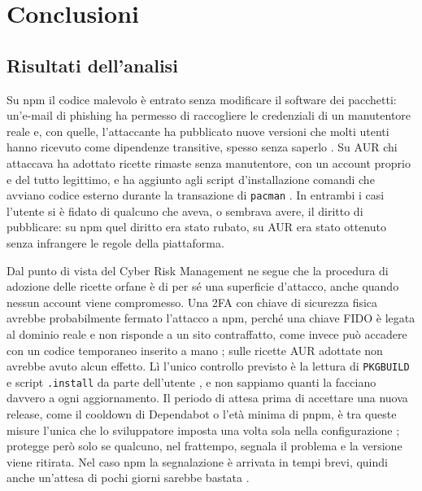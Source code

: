 \section{Conclusioni}
\subsection{Risultati dell'analisi}
Su npm il codice malevolo è entrato senza modificare il software dei pacchetti: un'e-mail di phishing ha permesso di raccogliere le credenziali di un manutentore reale e, con quelle, l'attaccante ha pubblicato nuove versioni che molti utenti hanno ricevuto come dipendenze transitive, spesso senza saperlo \cite{aikido2025,debug2025}. Su AUR chi attaccava ha adottato ricette rimaste senza manutentore, con un account proprio e del tutto legittimo, e ha aggiunto agli script d'installazione comandi che avviano codice esterno durante la transazione di \texttt{pacman} \cite{arch-aur-incident-2026,aur-mail-gnome-randr}. In entrambi i casi l'utente si è fidato di qualcuno che aveva, o sembrava avere, il diritto di pubblicare: su npm quel diritto era stato rubato, su AUR era stato ottenuto senza infrangere le regole della piattaforma.

Dal punto di vista del Cyber Risk Management ne segue che la procedura di adozione delle ricette orfane è di per sé una superficie d'attacco, anche quando nessun account viene compromesso. Una 2FA con chiave di sicurezza fisica avrebbe probabilmente fermato l'attacco a npm, perché una chiave FIDO è legata al dominio reale e non risponde a un sito contraffatto, come invece può accadere con un codice temporaneo inserito a mano \cite{npm-2fa-docs-2026}; sulle ricette AUR adottate non avrebbe avuto alcun effetto. Lì l'unico controllo previsto è la lettura di \texttt{PKGBUILD} e script \texttt{.install} da parte dell'utente \cite{arch-aur-incident-2026}, e non sappiamo quanti la facciano davvero a ogni aggiornamento. Il periodo di attesa prima di accettare una nuova release, come il cooldown di Dependabot o l'età minima di pnpm, è tra queste misure l'unica che lo sviluppatore imposta una volta sola nella configurazione \cite{github-disrupting-2026,pnpm-supply-chain}; protegge però solo se qualcuno, nel frattempo, segnala il problema e la versione viene ritirata. Nel caso npm la segnalazione è arrivata in tempi brevi, quindi anche un'attesa di pochi giorni sarebbe bastata \cite{aikido2025,debug2025}.


